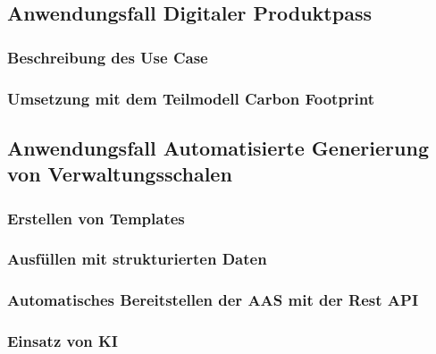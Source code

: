\subsection{Anwendungsfall Digitaler Produktpass}
\subsubsection{Beschreibung des Use Case}
\subsubsection{Umsetzung mit dem Teilmodell Carbon Footprint}
\subsection{Anwendungsfall Automatisierte Generierung von Verwaltungsschalen}
\subsubsection{Erstellen von Templates}
\subsubsection{Ausfüllen mit strukturierten Daten}
\subsubsection{Automatisches Bereitstellen der AAS mit der Rest API}
\subsubsection{Einsatz von KI}